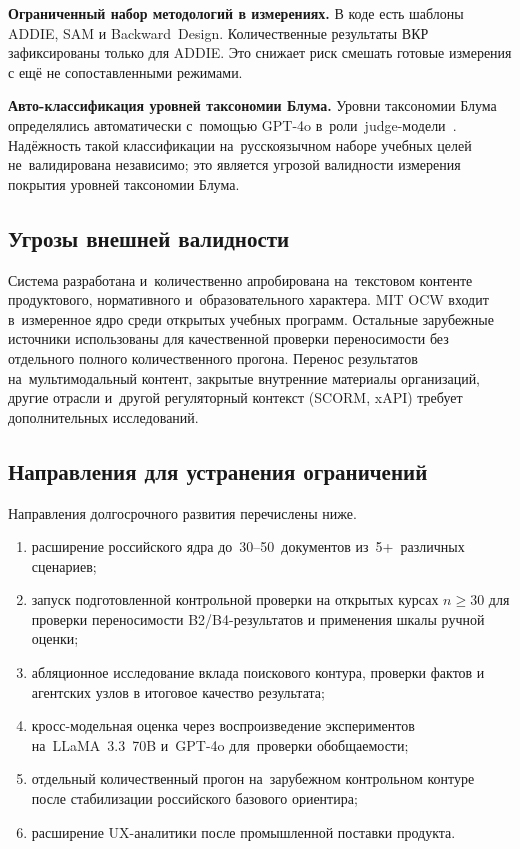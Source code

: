 \textbf{Ограниченный набор методологий в измерениях.}
В коде есть шаблоны ADDIE, SAM и Backward~Design. Количественные
результаты ВКР зафиксированы только для ADDIE. Это снижает риск
смешать готовые измерения с ещё не сопоставленными режимами.

\textbf{Авто-классификация уровней таксономии Блума.}
Уровни таксономии Блума определялись автоматически с~помощью
GPT-4o в~роли~judge-модели~\cite{mt_bench_2023}.
Надёжность такой классификации на~русскоязычном
наборе учебных целей
не~валидирована независимо; это является угрозой валидности
измерения покрытия уровней таксономии Блума.

\subsection{Угрозы внешней валидности}

Система разработана и~количественно апробирована на~текстовом
контенте продуктового, нормативного и~образовательного характера.
MIT OCW входит в~измеренное ядро среди открытых учебных программ.
Остальные зарубежные источники использованы для качественной проверки
переносимости без отдельного полного количественного прогона.
Перенос результатов на~мультимодальный контент, закрытые внутренние
материалы организаций, другие отрасли и~другой регуляторный контекст
(SCORM, xAPI) требует дополнительных исследований.

\subsection{Направления для устранения ограничений}

Направления долгосрочного развития перечислены ниже.
\begin{enumerate}
  \item расширение российского ядра до~30–50~документов
    из~5+~различных сценариев;
  \item запуск подготовленной контрольной проверки на открытых курсах $n \geq 30$
    для проверки переносимости B2/B4-результатов
    и применения шкалы ручной оценки;
  \item абляционное исследование вклада поискового контура, проверки фактов
    и агентских узлов в итоговое качество результата;
  \item кросс-модельная оценка через воспроизведение экспериментов
    на~LLaMA~3.3~70B и~GPT-4o для~проверки обобщаемости;
  \item отдельный количественный прогон на~зарубежном контрольном
    контуре после стабилизации российского базового ориентира;
  \item расширение UX-аналитики после промышленной поставки продукта.
\end{enumerate}

